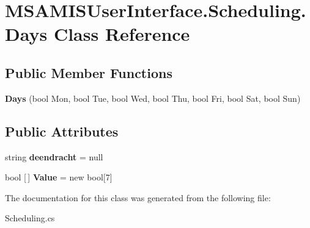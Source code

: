 \hypertarget{class_m_s_a_m_i_s_user_interface_1_1_scheduling_1_1_days}{}\section{M\+S\+A\+M\+I\+S\+User\+Interface.\+Scheduling.\+Days Class Reference}
\label{class_m_s_a_m_i_s_user_interface_1_1_scheduling_1_1_days}
\subsection*{Public Member Functions}
\begin{DoxyCompactItemize}
\item 
\mbox{\label{class_m_s_a_m_i_s_user_interface_1_1_scheduling_1_1_days_a1611a35ba5e8b23a671903232ab0d066}} 
{\bfseries Days} (bool Mon, bool Tue, bool Wed, bool Thu, bool Fri, bool Sat, bool Sun)
\end{DoxyCompactItemize}
\subsection*{Public Attributes}
\begin{DoxyCompactItemize}
\item 
\mbox{\label{class_m_s_a_m_i_s_user_interface_1_1_scheduling_1_1_days_a02eb95653e7d864ba02a6a517e462336}} 
string {\bfseries deendracht} = null
\item 
\mbox{\label{class_m_s_a_m_i_s_user_interface_1_1_scheduling_1_1_days_aa234e8bf130d9c5b75e3b49587a76b6f}} 
bool \mbox{[}$\,$\mbox{]} {\bfseries Value} = new bool\mbox{[}7\mbox{]}
\end{DoxyCompactItemize}


The documentation for this class was generated from the following file\+:\begin{DoxyCompactItemize}
\item 
Scheduling.\+cs\end{DoxyCompactItemize}
